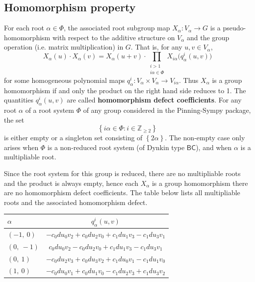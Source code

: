 \documentclass[11pt]{article}
\newcommand{\noi}{\noindent}
\newcommand{\tbf}{\textbf}
\newcommand{\lb}{\left\{}
\newcommand{\rb}{\right\}}
\newcommand{\Z}{\mathbb{Z}}
\theoremstyle{definition}
\newif\ifrootsystemreduced
\begin{document}
\subsection{Homomorphism property}

\noi For each root $\alpha \in \Phi$, the associated root subgroup map $X_\alpha:V_\alpha \to G$ is a pseudo-homomorphism with respect to the additive structure on $V_\alpha$ and the group operation (i.e. matrix multiplication) in $G$. That is, for any $u,v \in V_\alpha$,
\begin{equation}
\label{pseudo homomorphism}
	X_\alpha(u) \cdot X_\alpha(v) = X_\alpha(u+v) \cdot \prod_{\substack{i > 1 \\ i \alpha \in \Phi}} X_{i \alpha} \Big( q^i_\alpha(u,v) \Big)
\end{equation}
for some homogeneous polynomial maps $q^i_\alpha:V_\alpha \times V_\alpha \to V_{i \alpha}$. Thus $X_\alpha$ is a group homomorphism if and only the product on the right hand side reduces to 1. The quantities $q^i_\alpha(u,v)$ are called \tbf{homomorphism defect coefficients}. For any root $\alpha$ of a root system $\Phi$ of any group considered in the Pinning-Sympy package, the set
\[
	\lb i \alpha \in \Phi : i \in \Z_{\ge 2} \rb
\]
is either empty or a singleton set consisting of $\lb 2 \alpha \rb$. The non-empty case only arises when $\Phi$ is a non-reduced root system (of Dynkin type $\mathsf{BC}$), and when $\alpha$ is a multipliable root. 

\ifrootsystemreduced
Since the root system for this group is reduced, there are no multipliable roots and the product is always empty, hence each $X_\alpha$ is a group homomorphism there are no homomorphism defect coefficients.
\else
The table below lists all multipliable roots and the associated homomorphism defect.

\bigskip

\noindent \begin{tabular}{|l|c|}
    \hline
    $\alpha$ & $q^i_\alpha(u,v)$ \\
    \hline
    $\left( -1, \  0\right)$ & ${- c_{0} d u_{0} v_{2} + c_{0} d u_{2} v_{0} + c_{1} d u_{1} v_{3} - c_{1} d u_{3} v_{1}}$ \\
    \hline
    $\left( 0, \  -1\right)$ & ${c_{0} d u_{0} v_{2} - c_{0} d u_{2} v_{0} + c_{1} d u_{1} v_{3} - c_{1} d u_{3} v_{1}}$ \\
    \hline
    $\left( 0, \  1\right)$ & ${- c_{0} d u_{2} v_{3} + c_{0} d u_{3} v_{2} + c_{1} d u_{0} v_{1} - c_{1} d u_{1} v_{0}}$ \\
    \hline
    $\left( 1, \  0\right)$ & ${- c_{0} d u_{0} v_{1} + c_{0} d u_{1} v_{0} - c_{1} d u_{2} v_{3} + c_{1} d u_{3} v_{2}}$ \\
    \hline
\end{tabular}
\end{document}
